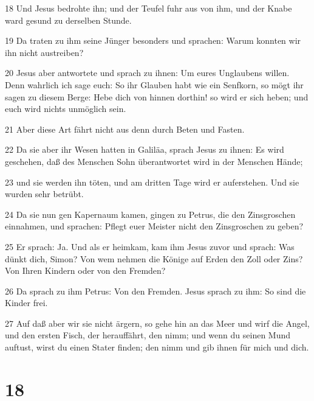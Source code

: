 \par 18 Und Jesus bedrohte ihn; und der Teufel fuhr aus von ihm, und der Knabe ward gesund zu derselben Stunde.
\par 19 Da traten zu ihm seine Jünger besonders und sprachen: Warum konnten wir ihn nicht austreiben?
\par 20 Jesus aber antwortete und sprach zu ihnen: Um eures Unglaubens willen. Denn wahrlich ich sage euch: So ihr Glauben habt wie ein Senfkorn, so mögt ihr sagen zu diesem Berge: Hebe dich von hinnen dorthin! so wird er sich heben; und euch wird nichts unmöglich sein.
\par 21 Aber diese Art fährt nicht aus denn durch Beten und Fasten.
\par 22 Da sie aber ihr Wesen hatten in Galiläa, sprach Jesus zu ihnen: Es wird geschehen, daß des Menschen Sohn überantwortet wird in der Menschen Hände;
\par 23 und sie werden ihn töten, und am dritten Tage wird er auferstehen. Und sie wurden sehr betrübt.
\par 24 Da sie nun gen Kapernaum kamen, gingen zu Petrus, die den Zinsgroschen einnahmen, und sprachen: Pflegt euer Meister nicht den Zinsgroschen zu geben?
\par 25 Er sprach: Ja. Und als er heimkam, kam ihm Jesus zuvor und sprach: Was dünkt dich, Simon? Von wem nehmen die Könige auf Erden den Zoll oder Zins? Von Ihren Kindern oder von den Fremden?
\par 26 Da sprach zu ihm Petrus: Von den Fremden. Jesus sprach zu ihm: So sind die Kinder frei.
\par 27 Auf daß aber wir sie nicht ärgern, so gehe hin an das Meer und wirf die Angel, und den ersten Fisch, der herauffährt, den nimm; und wenn du seinen Mund auftust, wirst du einen Stater finden; den nimm und gib ihnen für mich und dich.

\chapter{18}

